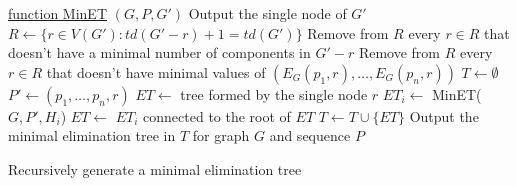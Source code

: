 \begin{algorithm}[H]

    \underline{function MinET} $(G, P, G')$\;
      {
        Output the single node of $G'$\;
      }
      {
        $R \leftarrow \{r \in V(G') : td(G'-r) +1 = td(G')\}$\;
        Remove from $R$ every $r \in R$ that doesn't have a minimal number of components in $G'-r$\;
        Remove from $R$ every $r \in R$ that doesn't have minimal values of $(E_G(p_1, r), \ldots, E_G(p_n, r))$\;
        $T \leftarrow \emptyset$\;
        {
        	$P' \leftarrow (p_1, \ldots, p_n, r)$\;
        	$ET \leftarrow$ tree formed by the single node $r$\;
        	{
        		$ET_i \leftarrow$ MinET($G, P', H_i$)\;
        		$ET \leftarrow$ $ET_i$ connected to the root of $ET$\;
        	}
        	$T \leftarrow T \cup \{ ET \}$\;
        }
        Output the minimal elimination tree in $T$ for graph $G$ and sequence $P$\;
      }
    \caption{Recursively generate a minimal elimination tree}
\end{algorithm}
